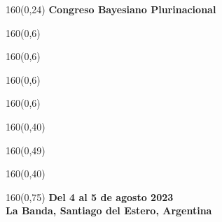 \documentclass[shownotes,aspectratio=169]{beamer}
\begin{document}
\color{black!85}
\large

\begin{frame}

\begin{textblock}{160}(0,24) \centering
\LARGE \textcolor{black!85}{\fontsize{22}{0}\selectfont \textbf{Congreso Bayesiano Plurinacional}}
\end{textblock}
\begin{textblock}{160}(0,6) \centering
\LARGE  \textcolor{black!85}{}
\end{textblock}
\begin{textblock}{160}(0,6) \centering
\LARGE \textcolor{black!85}{\scalebox{4}{$p$}}
\end{textblock}
\begin{textblock}{160}(0,6) \centering
\LARGE \textcolor{black!85}{\scalebox{3.7}{C} \hspace{2.4cm} }
\end{textblock}
\begin{textblock}{160}(0,6) \centering
\LARGE \textcolor{black!85}{ \hspace{2.5cm} \scalebox{3.7}{P} }
\end{textblock}

\begin{textblock}{160}(0,40)\centering
\hspace{3.6cm} \LARGE  \textcolor{black!85}{}
\end{textblock}

\begin{textblock}{160}(0,49) \centering
\LARGE  \textcolor{black!85}{\scalebox{4}{$=$}}
\end{textblock}

\begin{textblock}{160}(0,40)\centering
\hspace{-3.8cm} \LARGE  \textcolor{black!85}{\scalebox{6}{$p$}}
\end{textblock}

\begin{textblock}{160}(0,75) \centering \Large \textcolor{black!75}{\textbf{
Del 4 al 5 de agosto 2023 \\
La Banda, Santiago del Estero, Argentina \\}}
\end{textblock}

\end{frame}
\end{document}
